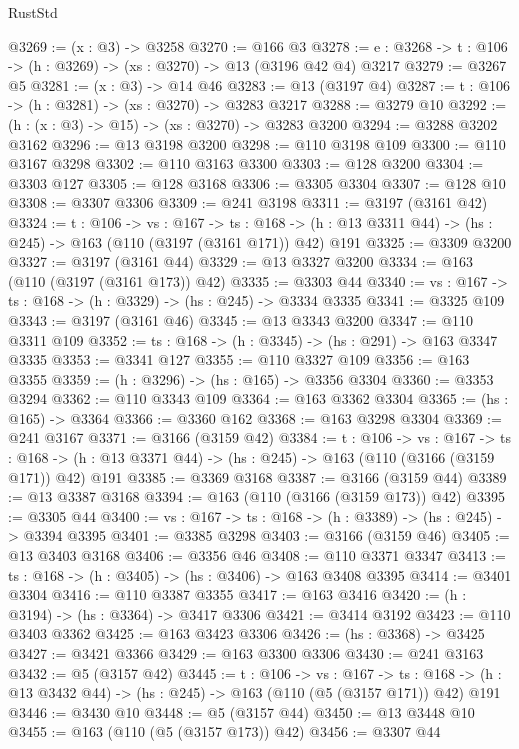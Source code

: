 \begin{lexlean}{RustStd}
\begin{coremodule}
{\begin{coremodule}
{{{{{@3269 := (x : @3) -> @3258
@3270 := @166 @3
@3278 := {e : @3268} -> {t : @106} -> (h : @3269) -> (xs : @3270) -> @13 (@3196 @42 @4) @3217
@3279 := @3267 @5
@3281 := (x : @3) -> @14 @46
@3283 := @13 (@3197 @4)
@3287 := {t : @106} -> (h : @3281) -> (xs : @3270) -> @3283 @3217
@3288 := @3279 @10
@3292 := (h : (x : @3) -> @15) -> (xs : @3270) -> @3283 @3200
@3294 := @3288 @3202 @3162
@3296 := @13 @3198 @3200
@3298 := @110 @3198 @109
@3300 := @110 @3167 @3298
@3302 := @110 @3163 @3300
@3303 := @128 @3200
@3304 := @3303 @127
@3305 := @128 @3168
@3306 := @3305 @3304
@3307 := @128 @10
@3308 := @3307 @3306
@3309 := @241 @3198
@3311 := @3197 (@3161 @42)
@3324 := {t : @106} ->
  {vs : @167} ->
  {ts : @168} -> (h : @13 @3311 @44) -> (hs : @245) -> @163 (@110 (@3197 (@3161 @171)) @42) @191
@3325 := @3309 @3200
@3327 := @3197 (@3161 @44)
@3329 := @13 @3327 @3200
@3334 := @163 (@110 (@3197 (@3161 @173)) @42)
@3335 := @3303 @44
@3340 := {vs : @167} -> {ts : @168} -> (h : @3329) -> (hs : @245) -> @3334 @3335
@3341 := @3325 @109
@3343 := @3197 (@3161 @46)
@3345 := @13 @3343 @3200
@3347 := @110 @3311 @109
@3352 := {ts : @168} -> (h : @3345) -> (hs : @291) -> @163 @3347 @3335
@3353 := @3341 @127
@3355 := @110 @3327 @109
@3356 := @163 @3355
@3359 := (h : @3296) -> (hs : @165) -> @3356 @3304
@3360 := @3353 @3294
@3362 := @110 @3343 @109
@3364 := @163 @3362 @3304
@3365 := (hs : @165) -> @3364
@3366 := @3360 @162
@3368 := @163 @3298 @3304
@3369 := @241 @3167
@3371 := @3166 (@3159 @42)
@3384 := {t : @106} ->
  {vs : @167} ->
  {ts : @168} -> (h : @13 @3371 @44) -> (hs : @245) -> @163 (@110 (@3166 (@3159 @171)) @42) @191
@3385 := @3369 @3168
@3387 := @3166 (@3159 @44)
@3389 := @13 @3387 @3168
@3394 := @163 (@110 (@3166 (@3159 @173)) @42)
@3395 := @3305 @44
@3400 := {vs : @167} -> {ts : @168} -> (h : @3389) -> (hs : @245) -> @3394 @3395
@3401 := @3385 @3298
@3403 := @3166 (@3159 @46)
@3405 := @13 @3403 @3168
@3406 := @3356 @46
@3408 := @110 @3371 @3347
@3413 := {ts : @168} -> (h : @3405) -> (hs : @3406) -> @163 @3408 @3395
@3414 := @3401 @3304
@3416 := @110 @3387 @3355
@3417 := @163 @3416
@3420 := (h : @3194) -> (hs : @3364) -> @3417 @3306
@3421 := @3414 @3192
@3423 := @110 @3403 @3362
@3425 := @163 @3423 @3306
@3426 := (hs : @3368) -> @3425
@3427 := @3421 @3366
@3429 := @163 @3300 @3306
@3430 := @241 @3163
@3432 := @5 (@3157 @42)
@3445 := {t : @106} ->
  {vs : @167} ->
  {ts : @168} -> (h : @13 @3432 @44) -> (hs : @245) -> @163 (@110 (@5 (@3157 @171)) @42) @191
@3446 := @3430 @10
@3448 := @5 (@3157 @44)
@3450 := @13 @3448 @10
@3455 := @163 (@110 (@5 (@3157 @173)) @42)
@3456 := @3307 @44
}}}}}
\end{coremodule}}
\end{coremodule}
\end{lexlean}
